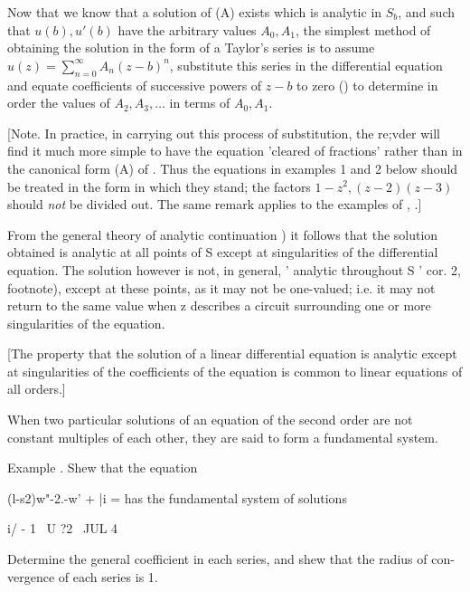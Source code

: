 Now that we know that a solution of (A) %
exists which is analytic in $S_{b}$,
and such that $u(b), u'(b)$ have the arbitrary values
$A_{0}, A_{1}$, the simplest method of obtaining the
solution in the form of a Taylor's series is to assume
$u(z) = \sum_{n=0}^{\infty} A_{n} (z-b)^{n}$, substitute this
series in the differential equation and
equate coefficients of successive powers of $z-b$ to zero
() to
determine in order the values of
$A_{2}, A_{3}, \ldots$ in terms of $A_{0}, A_{1}$.

[Note. In practice, in carrying out this process of substitution, the
re;vder will find it much more simple to have the equation 'cleared of
fractions' rather than in the canonical form (A) %
of . Thus the
equations in examples 1 and 2 %
below should be treated in the form in
which they stand; the factors
$1 - z^{2}, (z-2)(z-3)$
should \emph{not} be
divided out. The same remark applies to the examples of
, .] %

From the general theory of analytic continuation ) it follows
that the solution obtained is analytic at all points of S except at
singularities of the differential equation. The solution however is
not, in general, ' analytic throughout S '  cor. 2, footnote),
except at these points, as it may not be one-valued; i.e. it may not
return to the same value when z describes a circuit surrounding one or
more singularities of the equation.

%
%

[The property that the solution of a linear differential equation is
analytic except at singularities of the coefficients of the equation
is common to linear equations of all orders.]

When two particular solutions of an equation of the second order are
not constant multiples of each other, they are said to form a
fundamental system.

Example . Shew that the equation

(l-s2)w"-2.-w' + |i = has the fundamental system of solutions

i/ - 1 \ U ?2 \ JUL 4 \

Determine the general coefficient in each series, and shew that the
radius of con- vergence of each series is 1.

